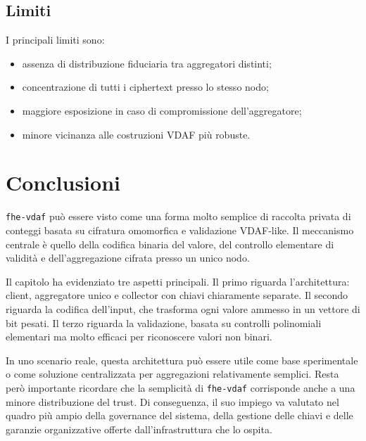 \subsection{Limiti}
I principali limiti sono:
\begin{itemize}
  \item assenza di distribuzione fiduciaria tra aggregatori distinti;
  \item concentrazione di tutti i ciphertext presso lo stesso nodo;
  \item maggiore esposizione in caso di compromissione dell'aggregatore;
  \item minore vicinanza alle costruzioni VDAF pi\`u robuste.
\end{itemize}

\section{Conclusioni}
\texttt{fhe-vdaf} pu\`o essere visto come una forma molto semplice di raccolta privata di conteggi basata su cifratura omomorfica e validazione VDAF-like. Il meccanismo centrale \`e quello della codifica binaria del valore, del controllo elementare di validit\`a e dell'aggregazione cifrata presso un unico nodo.

Il capitolo ha evidenziato tre aspetti principali. Il primo riguarda l'architettura: client, aggregatore unico e collector con chiavi chiaramente separate. Il secondo riguarda la codifica dell'input, che trasforma ogni valore ammesso in un vettore di bit pesati. Il terzo riguarda la validazione, basata su controlli polinomiali elementari ma molto efficaci per riconoscere valori non binari.

In uno scenario reale, questa architettura pu\`o essere utile come base sperimentale o come soluzione centralizzata per aggregazioni relativamente semplici. Resta per\`o importante ricordare che la semplicit\`a di \texttt{fhe-vdaf} corrisponde anche a una minore distribuzione del trust. Di conseguenza, il suo impiego va valutato nel quadro pi\`u ampio della governance del sistema, della gestione delle chiavi e delle garanzie organizzative offerte dall'infrastruttura che lo ospita.
